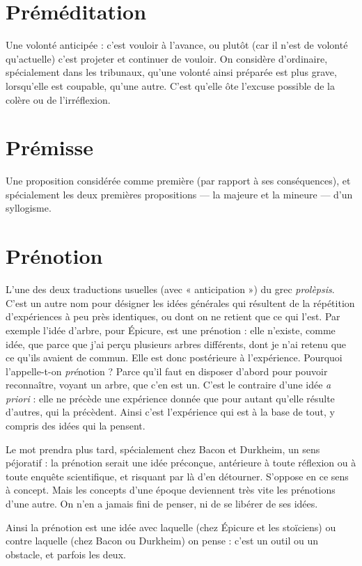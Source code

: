 \section{Préméditation}
Une volonté anticipée : c’est vouloir à l'avance, ou
plutôt (car il n’est de volonté qu’actuelle) c’est projeter
et continuer de vouloir. On considère d'ordinaire, spécialement dans les tribunaux,
qu’une volonté ainsi préparée est plus grave, lorsqu'elle est coupable,
qu’une autre. C’est qu’elle ôte l’excuse possible de la colère ou de l’irréflexion.

\section{Prémisse}
Une proposition considérée comme première (par rapport à ses
conséquences), et spécialement les deux premières propositions
— la majeure et la mineure — d’un syllogisme.

\section{Prénotion}
L'une des deux traductions usuelles (avec « anticipation ») du
grec {\it prolèpsis}. C’est un autre nom pour désigner les idées
générales qui résultent de la répétition d’expériences à peu près identiques, ou
dont on ne retient que ce qui l’est. Par exemple l’idée d’arbre, pour Épicure, est
une prénotion : elle n’existe, comme idée, que parce que j'ai perçu plusieurs
arbres différents, dont je n’ai retenu que ce qu'ils avaient de commun. Elle est
donc postérieure à l'expérience. Pourquoi l’appelle-t-on {\it pré}notion ? Parce qu'il
faut en disposer d’abord pour pouvoir reconnaître, voyant un arbre, que c'en
est un. C’est le contraire d’une idée {\it a priori} : elle ne précède une expérience
donnée que pour autant qu’elle résulte d’autres, qui la précèdent. Ainsi c’est
l'expérience qui est à la base de tout, y compris des idées qui la pensent.

Le mot prendra plus tard, spécialement chez Bacon et Durkheim, un sens
péjoratif : la prénotion serait une idée préconçue, antérieure à toute réflexion
ou à toute enquête scientifique, et risquant par là d’en détourner. S’oppose en
ce sens à concept. Mais les concepts d’une époque deviennent très vite les prénotions
d’une autre. On n’en a jamais fini de penser, ni de se libérer de ses
idées.

Ainsi la prénotion est une idée avec laquelle (chez Épicure et les stoïciens)
ou contre laquelle (chez Bacon ou Durkheim) on pense : c’est un outil ou un
obstacle, et parfois les deux.

